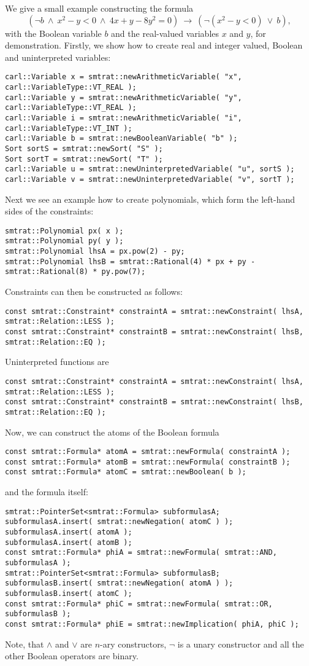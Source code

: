 We give a small example constructing the formula \[(\neg b\ \land\ x^2-y<0\ \land\ 4x+y-8y^2=0 )\ \rightarrow\ (\neg(x^2-y<0)\ \lor\ b ),\] with the Boolean variable $b$ and the real-valued variables $x$ and $y$, for demonstration. Firstly, we show how to create real and integer valued, Boolean and uninterpreted variables:
\scriptsize
\begin{verbatim}
carl::Variable x = smtrat::newArithmeticVariable( "x", carl::VariableType::VT_REAL );
carl::Variable y = smtrat::newArithmeticVariable( "y", carl::VariableType::VT_REAL );
carl::Variable i = smtrat::newArithmeticVariable( "i", carl::VariableType::VT_INT );
carl::Variable b = smtrat::newBooleanVariable( "b" );
Sort sortS = smtrat::newSort( "S" );
Sort sortT = smtrat::newSort( "T" );
carl::Variable u = smtrat::newUninterpretedVariable( "u", sortS );
carl::Variable v = smtrat::newUninterpretedVariable( "v", sortT );
\end{verbatim}
\normalsize
Next we see an example how to create polynomials, which form the left-hand sides of the constraints:
\scriptsize
\begin{verbatim}
smtrat::Polynomial px( x );
smtrat::Polynomial py( y );
smtrat::Polynomial lhsA = px.pow(2) - py;
smtrat::Polynomial lhsB = smtrat::Rational(4) * px + py - smtrat::Rational(8) * py.pow(7);
\end{verbatim}
\normalsize
Constraints can then be constructed as follows:
\scriptsize
\begin{verbatim}
const smtrat::Constraint* constraintA = smtrat::newConstraint( lhsA, smtrat::Relation::LESS );
const smtrat::Constraint* constraintB = smtrat::newConstraint( lhsB, smtrat::Relation::EQ );
\end{verbatim}
\normalsize
Uninterpreted functions are 
\scriptsize
\begin{verbatim}
const smtrat::Constraint* constraintA = smtrat::newConstraint( lhsA, smtrat::Relation::LESS );
const smtrat::Constraint* constraintB = smtrat::newConstraint( lhsB, smtrat::Relation::EQ );
\end{verbatim}
\normalsize
Now, we can construct the atoms of the Boolean formula
\scriptsize
\begin{verbatim}
const smtrat::Formula* atomA = smtrat::newFormula( constraintA );
const smtrat::Formula* atomB = smtrat::newFormula( constraintB );
const smtrat::Formula* atomC = smtrat::newBoolean( b );
\end{verbatim}
\normalsize
and the formula itself:
\scriptsize
\begin{verbatim}
smtrat::PointerSet<smtrat::Formula> subformulasA;
subformulasA.insert( smtrat::newNegation( atomC ) );
subformulasA.insert( atomA );
subformulasA.insert( atomB );
const smtrat::Formula* phiA = smtrat::newFormula( smtrat::AND, subformulasA );
smtrat::PointerSet<smtrat::Formula> subformulasB;
subformulasB.insert( smtrat::newNegation( atomA ) );
subformulasB.insert( atomC );
const smtrat::Formula* phiC = smtrat::newFormula( smtrat::OR, subformulasB );
const smtrat::Formula* phiE = smtrat::newImplication( phiA, phiC );
\end{verbatim}
\normalsize
Note, that $\land$ and $\lor$ are $n$-ary constructors, $\neg$ is a unary constructor and all the other Boolean operators are binary.

